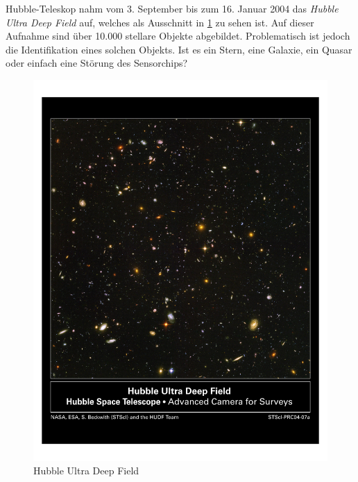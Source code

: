 \documentclass[12pt,journal,compsoc,ngerman]{IEEEtran}
\begin{document}
% 

 Hubble-Teleskop nahm vom 3. September bis zum 16. Januar
2004 das \emph{Hubble Ultra Deep Field} auf, welches als Ausschnitt in \cref{fig:hs-2004-07-a-pdf} zu sehen ist. Auf dieser Aufnahme sind über 10.000 stellare Objekte abgebildet.
Problematisch ist jedoch die Identifikation eines solchen Objekts. Ist es ein Stern, eine Galaxie,
ein Quasar oder einfach eine Störung des Sensorchips?

% 

\begin{figure}[!t]
\centering
\includegraphics[scale=0.45,trim={40 400 40 80},clip]{../beamer/hs-2004-07-a-pdf}
\caption{Hubble Ultra Deep Field \cite{HUDF}}
\label{fig:hs-2004-07-a-pdf}
\end{figure}

\end{document}
